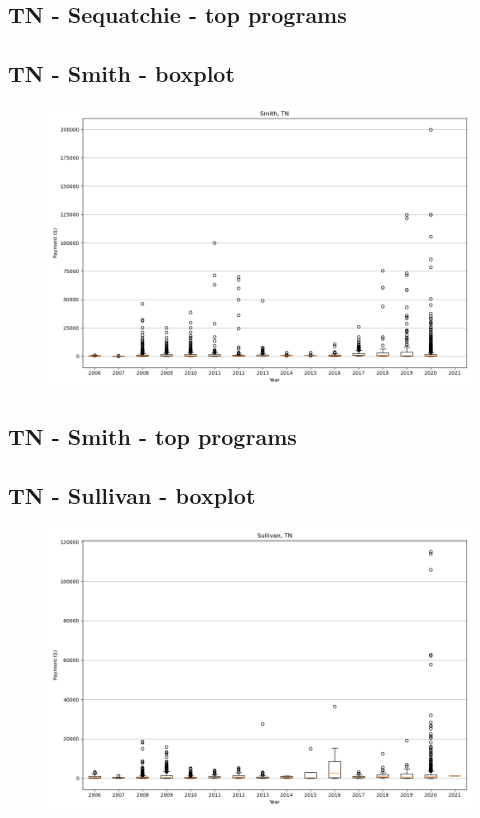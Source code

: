 \subsection*{TN - Sequatchie - top programs}

\newpage
\subsection*{TN - Smith - boxplot}
\begin{figure}[h]
\centering
\includegraphics[width=7in]{../output/boxplots/counties/Smith-TN_boxplot.png}
\end{figure}


\subsection*{TN - Smith - top programs}

\newpage
\subsection*{TN - Sullivan - boxplot}
\begin{figure}[h]
\centering
\includegraphics[width=7in]{../output/boxplots/counties/Sullivan-TN_boxplot.png}
\end{figure}


